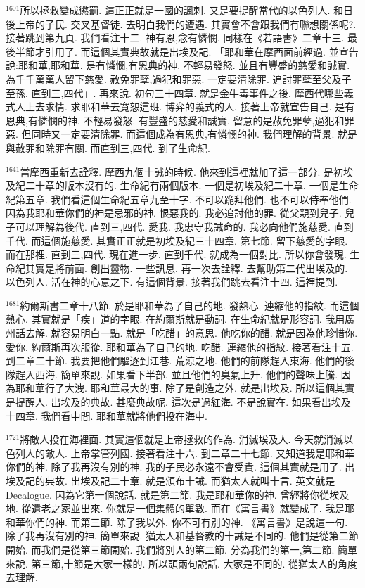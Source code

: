 \documentclass{book}
\begin{document}
$^{1601}$所以拯救變成懲罰.
這正正就是一國的諷刺.
又是要提醒當代的以色列人.
和日後上帝的子民.
交叉基督徒.
去明白我們的遭遇.
其實會不會跟我們有聯想關係呢?.
接著跳到第九頁.
我們看注十二.
神有恩,念有憐憫.
同樣在《若語書》二章十三.
最後半節才引用了.
而這個其實典故就是出埃及記.
「耶和華在摩西面前經過.
並宣告說:耶和華,耶和華.
是有憐憫,有恩典的神.
不輕易發怒.
並且有豐盛的慈愛和誠實.
為千千萬萬人留下慈愛.
赦免罪孽,過犯和罪惡.
一定要清除罪.
追討罪孽至父及子至孫.
直到三,四代」.
再來說.
初句三十四章.
就是金牛毒事件之後.
摩西代哪些義式人上去求情.
求耶和華去寬恕這班.
博弈的義式的人.
接著上帝就宣告自己.
是有恩典,有憐憫的神.
不輕易發怒.
有豐盛的慈愛和誠實.
留意的是赦免罪孽,過犯和罪惡.
但同時又一定要清除罪.
而這個成為有恩典,有憐憫的神.
我們理解的背景.
就是與赦罪和除罪有關.
而直到三,四代.
到了生命紀.

$^{1641}$當摩西重新去詮釋.
摩西九個十誡的時候.
他來到這裡就加了這一部分.
是初埃及紀二十章的版本沒有的.
生命紀有兩個版本.
一個是初埃及紀二十章.
一個是生命紀第五章.
我們看這個生命紀五章九至十字.
不可以跪拜他們.
也不可以侍奉他們.
因為我耶和華你們的神是忌邪的神.
恨惡我的.
我必追討他的罪.
從父親到兒子.
兒子可以理解為後代.
直到三,四代.
愛我.
我忠守我誡命的.
我必向他們施慈愛.
直到千代.
而這個施慈愛.
其實正正就是初埃及紀三十四章.
第七節.
留下慈愛的字眼.
而在那裡.
直到三,四代.
現在進一步.
直到千代.
就成為一個對比.
所以你會發現.
生命紀其實是將前面.
創出靈物.
一些訊息.
再一次去詮釋.
去幫助第二代出埃及的.
以色列人.
活在神的心意之下.
有這個背景.
接著我們跳去看注十四.
這裡提到.

$^{1681}$約爾斯書二章十八節.
於是耶和華為了自己的地.
發熱心.
連縮他的指紋.
而這個熱心.
其實就是「疾」道的字眼.
在約爾斯就是動詞.
在生命紀就是形容詞.
我用廣州話去解.
就容易明白一點.
就是「吃醋」的意思.
他吃你的醋.
就是因為他珍惜你.
愛你.
約爾斯再次服從.
耶和華為了自己的地.
吃醋.
連縮他的指紋.
接著看注十五.
到二章二十節.
我要把他們驅逐到江巷.
荒涼之地.
他們的前隊趕入東海.
他們的後隊趕入西海.
簡單來說.
如果看下半部.
並且他們的臭氣上升.
他們的聲味上騰.
因為耶和華行了大洩.
耶和華最大的事.
除了是創造之外.
就是出埃及.
所以這個其實是提醒人.
出埃及的典故.
甚麼典故呢.
這次是過紅海.
不是說實在.
如果看出埃及十四章.
我們看中間.
耶和華就將他們投在海中.

$^{1721}$將敵人投在海裡面.
其實這個就是上帝拯救的作為.
消滅埃及人.
今天就消滅以色列人的敵人.
上帝掌管列國.
接著看注十六.
到二章二十七節.
又知道我是耶和華你們的神.
除了我再沒有別的神.
我的子民必永遠不會受貴.
這個其實就是用了.
出埃及記的典故.
出埃及記二十章.
就是頒布十誡.
而猶太人就叫十言.
英文就是Decalogue.
因為它第一個說話.
就是第二節.
我是耶和華你的神.
曾經將你從埃及地.
從遺老之家並出來.
你就是一個集體的單數.
而在《寓言書》就變成了.
我是耶和華你們的神.
而第三節.
除了我以外.
你不可有別的神.
《寓言書》是說這一句.
除了我再沒有別的神.
簡單來說.
猶太人和基督教的十誡是不同的.
他們是從第二節開始.
而我們是從第三節開始.
我們將別人的第二節.
分為我們的第一,第二節.
簡單來說.
第三節,十節是大家一樣的.
所以頭兩句說話.
大家是不同的.
從猶太人的角度去理解.
\end{document}
